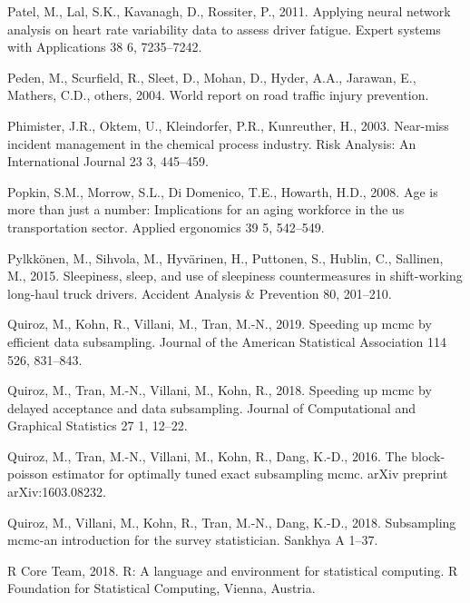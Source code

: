 \documentclass[12pt]{book}
\numberwithin{equation}{chapter}
\begin{document}
\leavevmode\hypertarget{ref-patel2011applying}{}%
Patel, M., Lal, S.K., Kavanagh, D., Rossiter, P., 2011. Applying neural network analysis on heart rate variability data to assess driver fatigue. Expert systems with Applications 38 6, 7235--7242.

\leavevmode\hypertarget{ref-peden2004world}{}%
Peden, M., Scurfield, R., Sleet, D., Mohan, D., Hyder, A.A., Jarawan, E., Mathers, C.D., others, 2004. World report on road traffic injury prevention.

\leavevmode\hypertarget{ref-phimister2003near}{}%
Phimister, J.R., Oktem, U., Kleindorfer, P.R., Kunreuther, H., 2003. Near-miss incident management in the chemical process industry. Risk Analysis: An International Journal 23 3, 445--459.

\leavevmode\hypertarget{ref-popkin2008age}{}%
Popkin, S.M., Morrow, S.L., Di Domenico, T.E., Howarth, H.D., 2008. Age is more than just a number: Implications for an aging workforce in the us transportation sector. Applied ergonomics 39 5, 542--549.

\leavevmode\hypertarget{ref-pylkkonen2015sleepiness}{}%
Pylkkönen, M., Sihvola, M., Hyvärinen, H., Puttonen, S., Hublin, C., Sallinen, M., 2015. Sleepiness, sleep, and use of sleepiness countermeasures in shift-working long-haul truck drivers. Accident Analysis \& Prevention 80, 201--210.

\leavevmode\hypertarget{ref-quiroz2019speeding}{}%
Quiroz, M., Kohn, R., Villani, M., Tran, M.-N., 2019. Speeding up mcmc by efficient data subsampling. Journal of the American Statistical Association 114 526, 831--843.

\leavevmode\hypertarget{ref-quiroz2018speeding}{}%
Quiroz, M., Tran, M.-N., Villani, M., Kohn, R., 2018. Speeding up mcmc by delayed acceptance and data subsampling. Journal of Computational and Graphical Statistics 27 1, 12--22.

\leavevmode\hypertarget{ref-quiroz2016block}{}%
Quiroz, M., Tran, M.-N., Villani, M., Kohn, R., Dang, K.-D., 2016. The block-poisson estimator for optimally tuned exact subsampling mcmc. arXiv preprint arXiv:1603.08232.

\leavevmode\hypertarget{ref-quiroz2018subsampling}{}%
Quiroz, M., Villani, M., Kohn, R., Tran, M.-N., Dang, K.-D., 2018. Subsampling mcmc-an introduction for the survey statistician. Sankhya A 1--37.

\leavevmode\hypertarget{ref-Rcitation}{}%
R Core Team, 2018. R: A language and environment for statistical computing. R Foundation for Statistical Computing, Vienna, Austria.
\end{document}

